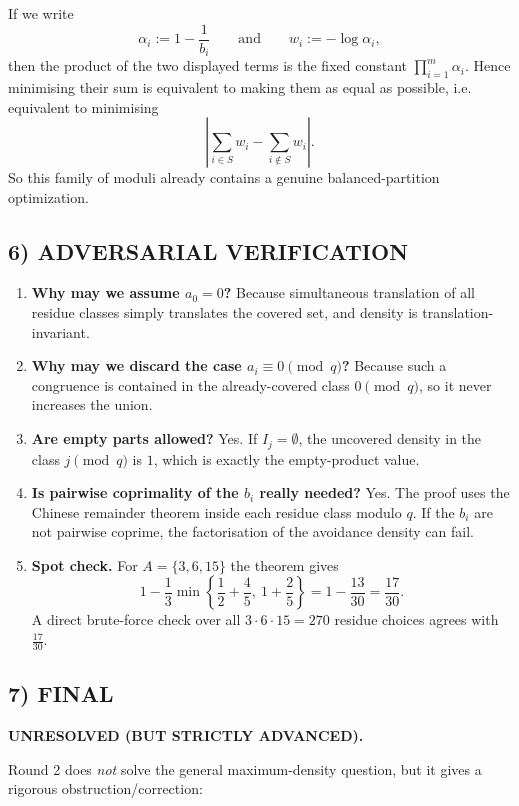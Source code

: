 If we write
\[
\alpha_i:=1-\frac{1}{b_i}
\qquad\text{and}\qquad
w_i:=-\log \alpha_i,
\]
then the product of the two displayed terms is the fixed constant $\prod_{i=1}^m \alpha_i$. Hence minimising their sum is equivalent to making them as equal as possible, i.e. equivalent to minimising
\[
\left|
\sum_{i\in S} w_i-\sum_{i\notin S} w_i
\right|.
\]
So this family of moduli already contains a genuine balanced-partition optimization.

\subsection*{6) ADVERSARIAL VERIFICATION}

\begin{enumerate}
\item \textbf{Why may we assume $a_0=0$?} Because simultaneous translation of all residue classes simply translates the covered set, and density is translation-invariant.

\item \textbf{Why may we discard the case $a_i\equiv 0\pmod q$?} Because such a congruence is contained in the already-covered class $0\pmod q$, so it never increases the union.

\item \textbf{Are empty parts allowed?} Yes. If $I_j=\emptyset$, the uncovered density in the class $j\pmod q$ is $1$, which is exactly the empty-product value.

\item \textbf{Is pairwise coprimality of the $b_i$ really needed?} Yes. The proof uses the Chinese remainder theorem inside each residue class modulo $q$. If the $b_i$ are not pairwise coprime, the factorisation of the avoidance density can fail.

\item \textbf{Spot check.} For $A=\{3,6,15\}$ the theorem gives
\[
1-\frac13\min\!\left\{\frac12+\frac45,\ 1+\frac25\right\}
=
1-\frac{13}{30}
=
\frac{17}{30}.
\]
A direct brute-force check over all $3\cdot 6\cdot 15=270$ residue choices agrees with $\frac{17}{30}$.
\end{enumerate}

\subsection*{7) FINAL}

\textbf{UNRESOLVED (BUT STRICTLY ADVANCED).}

Round 2 does \emph{not} solve the general maximum-density question, but it gives a rigorous obstruction/correction:

